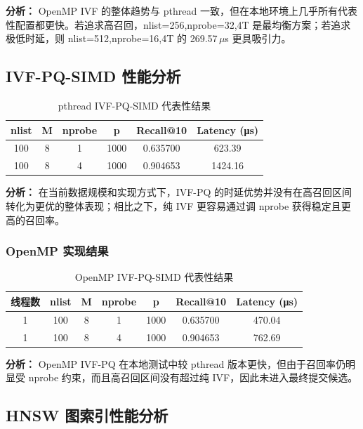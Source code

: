 \documentclass[a4paper]{article}
\begin{document}
\textbf{分析：} OpenMP IVF 的整体趋势与 pthread 一致，但在本地环境上几乎所有代表性配置都更快。若追求高召回，nlist=256,nprobe=32,4T 是最均衡方案；若追求极低时延，则 nlist=512,nprobe=16,4T 的 269.57\,$\mu$s 更具吸引力。

\subsection{IVF-PQ-SIMD 性能分析}

\begin{table}[htbp]
\centering
\caption{pthread IVF-PQ-SIMD 代表性结果}
\begin{tabular}{cccccc}
\toprule
nlist & M & nprobe & p & Recall@10 & Latency (μs) \\
\midrule
100 & 8 & 1 & 1000 & 0.635700 & 623.39 \\
100 & 8 & 4 & 1000 & 0.904653 & 1424.16 \\
\bottomrule
\end{tabular}
\end{table}

\textbf{分析：} 在当前数据规模和实现方式下，IVF-PQ 的时延优势并没有在高召回区间转化为更优的整体表现；相比之下，纯 IVF 更容易通过调 nprobe 获得稳定且更高的召回率。

\subsubsection{OpenMP 实现结果}

\begin{table}[htbp]
\centering
\caption{OpenMP IVF-PQ-SIMD 代表性结果}
\begin{tabular}{ccccccc}
\toprule
线程数 & nlist & M & nprobe & p & Recall@10 & Latency (μs) \\
\midrule
1 & 100 & 8 & 1 & 1000 & 0.635700 & 470.04 \\
1 & 100 & 8 & 4 & 1000 & 0.904653 & 762.69 \\
\bottomrule
\end{tabular}
\end{table}

\textbf{分析：} OpenMP IVF-PQ 在本地测试中较 pthread 版本更快，但由于召回率仍明显受 nprobe 约束，而且高召回区间没有超过纯 IVF，因此未进入最终提交候选。

\subsection{HNSW 图索引性能分析}
\label{sec:hnsw-perf}
\end{document}
